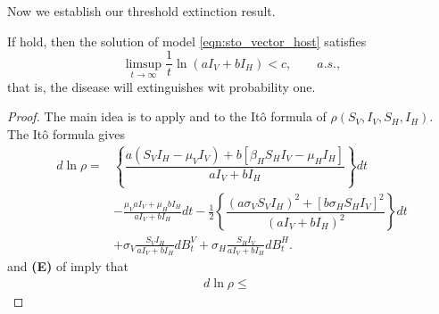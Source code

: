 %
%
%
Now we establish our threshold extinction result.
\begin{theorem}
    If  hold, then the solution of model 
    \eqref{eqn:sto_vector_host} satisfies
    \begin{equation}
        \limsup_{t \to \infty}
            \frac{1}{t}
            \ln(aI_V + b I_H) < c , \qquad a.s.,
    \end{equation}
    that is, the disease will extinguishes wit probability one.
\end{theorem}
%
%
\begin{proof}
    The main idea is to apply  and 
     to the It\^{o} formula of $\rho(S_V, I_V, S_H, 
    I_H)           $.
        The It\^{o} formula gives
    \begin{equation} \label{eqn:ito_extinction} 
        \begin{aligned}
          d \ln \rho =&
            \left \{
                \dfrac{
                    a ( S_V I_H - \mu_V I_V)
                    +
                    b [\beta_H S_H I_V - \mu_H I_H]
                }{a I_V + bI_H}
            \right \} dt
            \\
            & 
            -
            \frac{\mu_V  a I_V + \mu_H b I_H}{a I_V + b I_H}
            dt
            -
            \frac{1}{2}
            \left \{
                \dfrac{
                    \left(
                        a \sigma_V S_V I_H
                    \right) ^ 2
                    +
                    \left[
                        b \sigma_H S_H I_V
                    \right] ^2
                }{
                    \left( 
                        a I_V + bI_H
                    \right) ^ 2
                }
            \right \} dt
            \\
            & +
            \sigma_V 
            \frac{S_V I_H}{a I_V + b I_H}
            d B_t ^ V
            +
            \sigma_H 
            \frac{S_H I_V}{a I_V + b I_H}
            d B_t ^ H .
        \end{aligned}
    \end{equation}
     and \textsc{\textbf{(E)}} of 
     imply that
    \begin{equation} 
        \label{eqn:ito_extinction_bound} 
        \begin{aligned}
          d \ln \rho 
            \leq &

\end{aligned}
\end{equation}
\end{proof}
